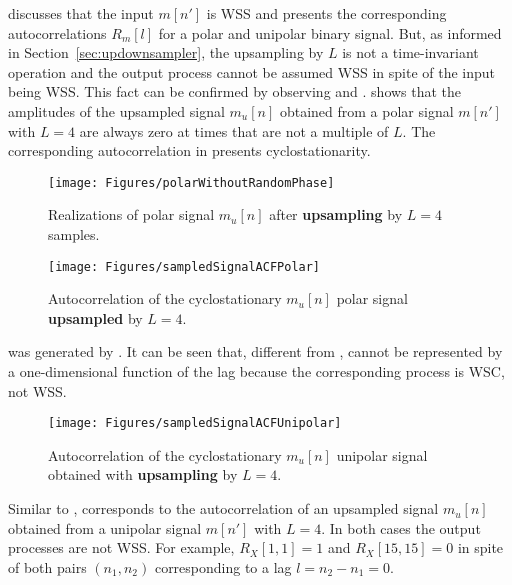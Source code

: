 discusses that the input $m[n']$ is WSS and presents the corresponding autocorrelations $R_m[l]$ for a polar and unipolar binary signal. 
But, as informed in Section~\ref{sec:updownsampler}, the upsampling by $L$ is not a time-invariant operation and the output process cannot be assumed WSS in spite of the input being WSS. This fact can be confirmed by observing  and .   shows that 
the amplitudes of the upsampled signal $m_u[n]$ obtained from a polar signal $m[n']$ with $L=4$ are always zero at times that are not a multiple of $L$. The corresponding autocorrelation in  presents cyclostationarity.

\begin{figure}[htbp]
\centering
\texttt{[image: Figures/polarWithoutRandomPhase]}
\caption{Realizations of polar signal $m_u[n]$ after \textbf{upsampling} by $L=4$ samples.\label{fig:polarWithoutRandomPhase}}
\end{figure}


\begin{figure}[htbp]
\centering
\texttt{[image: Figures/sampledSignalACFPolar]}
\caption{Autocorrelation of the cyclostationary $m_u[n]$ polar signal \textbf{upsampled} by $L=4$.\label{fig:sampledSignalACFPolar}}
\end{figure}


 was generated by .
It can be seen that, different from ,  
cannot be represented by a one-dimensional function of the lag because the corresponding
process is WSC, not WSS.


\begin{figure}[htbp]
\centering
\texttt{[image: Figures/sampledSignalACFUnipolar]}
\caption{Autocorrelation of the cyclostationary $m_u[n]$ unipolar signal obtained with \textbf{upsampling} by $L=4$.\label{fig:sampledSignalACFUnipolar}}
\end{figure}

Similar to ,  corresponds to the autocorrelation of an upsampled signal $m_u[n]$ obtained from a unipolar signal $m[n']$ with $L=4$.
In both cases the output processes are not WSS. For example, $R_X[1,1]=1$ and $R_X[15,15]=0$ in spite of both pairs $(n_1,n_2)$ corresponding to a lag $l=n_2-n_1=0$.


